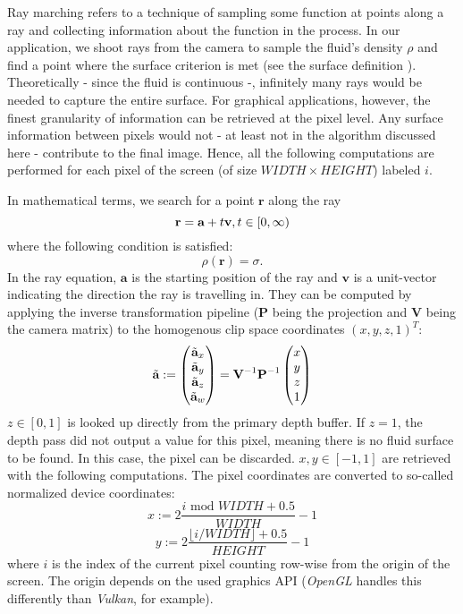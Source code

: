 Ray marching refers to a technique of sampling some function at points along a ray and collecting information about the function in the process. In our application, we shoot rays from the camera to sample the fluid's density $\rho$ and find a point where the surface criterion is met (see the surface definition ). Theoretically - since the fluid is continuous -, infinitely many rays would be needed to capture the entire surface. For graphical applications, however, the finest granularity of information can be retrieved at the pixel level. Any surface information between pixels would not - at least not in the algorithm discussed here - contribute to the final image. Hence, all the following computations are performed for each pixel of the screen (of size $WIDTH \times HEIGHT$) labeled $i$.

In mathematical terms, we search for a point $\textbf{r}$ along the ray
\[ \textbf{r} = \textbf{a} + t \textbf{v}, \space t \in [0, \infty) \]
where the following condition is satisfied:
\[ \rho ( \textbf{r} ) = \sigma. \]
In the ray equation, $\textbf{a}$ is the starting position of the ray and $\textbf{v}$ is a unit-vector indicating the direction the ray is travelling in. They can be computed by applying the inverse transformation pipeline ($\textbf{P}$ being the projection and $\textbf{V}$ being the camera matrix) to the homogenous clip space coordinates $( x, y, z, 1 )^T$:
\[
\tilde{\textbf{a}} :=
\begin{pmatrix}
\tilde{\textbf{a}}_x \\
\tilde{\textbf{a}}_y \\
\tilde{\textbf{a}}_z \\
\tilde{\textbf{a}}_w
\end{pmatrix} =
\textbf{V}^{-1} \space \textbf{P}^{-1} \space
\begin{pmatrix} x \\ y \\ z \\ 1 \end{pmatrix}
\]
$z \in [0, 1]$ is looked up directly from the primary depth buffer. If $z = 1$, the depth pass did not output a value for this pixel, meaning there is no fluid surface to be found. In this case, the pixel can be discarded. $x, y \in [-1, 1]$ are retrieved with the following computations. The pixel coordinates are converted to so-called normalized device coordinates:
\[ x := 2 \frac{i \text{ mod } WIDTH + 0.5}{WIDTH} - 1 \]
\[ y := 2 \frac{\lfloor i / WIDTH \rfloor + 0.5}{HEIGHT} - 1 \]
where $i$ is the index of the current pixel counting row-wise from the origin of the screen. The origin depends on the used graphics API (\textit{OpenGL} handles this differently than \textit{Vulkan}, for example).

